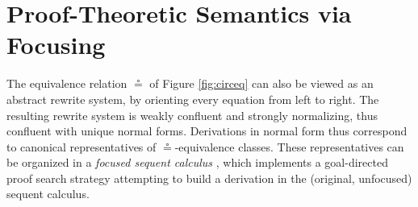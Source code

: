 \documentclass[submission,copyright,creativecommons]{eptcs}
\theoremstyle{definition}
\newcommand{\FSkMCC}{\textsf{Free}}
\begin{document}

\section{Proof-Theoretic Semantics via Focusing}
\label{sec:focus}
The equivalence relation $\circeq$ of Figure \ref{fig:circeq} can also be viewed as an abstract rewrite system, by orienting every equation from left to right. The resulting rewrite system is weakly confluent and strongly normalizing, thus confluent with unique normal forms. Derivations in normal form thus correspond to canonical representatives of $\circeq$-equivalence classes.
These representatives can be organized in a \emph{focused sequent calculus} \cite{andreoli:logic:1992}, which implements a goal-directed proof search strategy attempting to build a derivation in the (original, unfocused) sequent calculus.
\end{document}
